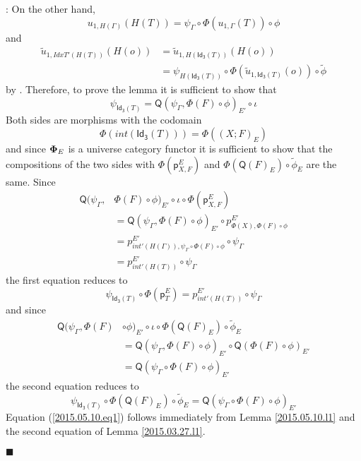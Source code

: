 \documentclass[12pt]{article}
\numberwithin{equation}{section}
\newenvironment{eq}{\begin{equation}}{\end{equation}}
\newenvironment{myproof}{{\bf Proof}:}{$\blacksquare$ \vskip 5mm }
\newcommand{\llabel}[1]{\label{#1}}
\newcommand{\wt}{\widetilde}
\newcommand{\p}{\mathsf{p}}
\newcommand{\Idx}{\mathsf{Id_3}} %
\newcommand{\Q}{\mathsf{Q}}
\begin{document}
\begin{myproof}
On the other hand,
%
$$u_{1,H(\Gamma)}(H(T))=\psi_{\Gamma}\circ \Phi(u_{1,\Gamma}(T))\circ \phi$$
and
\begin{align*}
  \wt{u}_{1,IdxT'(H(T))}(H(o))
    & = \wt{u}_{1,H(\Idx(T))}(H(o)) \\
    & = \psi_{H(\Idx(T))}\circ \Phi(\wt{u}_{1,\Idx(T)}(o))\circ \wt{\phi}
\end{align*}
%
by \cite[Lemma 6.1(1,2)]{fromunivwithPi}. Therefore, to prove the lemma it is
sufficient to show that
%
$$\psi_{\Idx(T)}=\Q(\psi_{\Gamma},\Phi(F)\circ\phi)_{E'}\circ\iota$$
%
Both sides are morphisms with the codomain
%
$$\Phi(int(\Idx(T)))=\Phi((X;F)_E)$$
%
and since ${\bf\Phi}_E$ is a universe category functor it is sufficient to show
that the compositions of the two sides with $\Phi(\p^E_{X,F})$ and
$\Phi(\Q(F)_E)\circ \wt{\phi}_E$ are the same. Since
%
\begin{align*}
  \Q(\psi_{\Gamma},&\Phi(F)\circ\phi)_{E'}\circ\iota\circ \Phi(\p^E_{X,F}) \\
    & = \Q(\psi_{\Gamma},\Phi(F)\circ\phi)_{E'}\circ p^{E'}_{\Phi(X),\Phi(F)\circ\phi} \\
    & = p^{E'}_{int'(H(\Gamma)),\psi_{\Gamma}\circ \Phi(F)\circ\phi}\circ\psi_{\Gamma} \\
    & = p^{E'}_{int'(H(T))}\circ\psi_{\Gamma}
\end{align*}
%
the first equation reduces to
%
\begin{eq}
\llabel{2015.05.10.eq1} \psi_{\Idx(T)}\circ
\Phi(\p^E_{T})=p^{E'}_{int'(H(T))}\circ\psi_{\Gamma}
\end{eq}%
%
and since
%
\begin{align*}
  \Q(\psi_{\Gamma},\Phi(F)&\circ\phi)_{E'}\circ\iota\circ \Phi(\Q(F)_E)\circ \wt{\phi}_E \\
    & = \Q(\psi_{\Gamma},\Phi(F)\circ\phi)_{E'}\circ \Q(\Phi(F)\circ\phi)_{E'} \\
    & = \Q(\psi_{\Gamma}\circ \Phi(F)\circ \phi)_{E'}
\end{align*}
%
the second equation reduces to
%
\begin{eq}
\llabel{2015.05.10.eq2.0} \psi_{\Idx(T)}\circ \Phi(\Q(F)_E)\circ
\wt{\phi}_E=\Q(\psi_{\Gamma}\circ \Phi(F)\circ \phi)_{E'}
\end{eq}%
%
Equation (\ref{2015.05.10.eq1}) follows immediately from Lemma
\ref{2015.05.10.l1} and the second equation of Lemma \ref{2015.03.27.l1}.


\end{myproof}
\end{document}
